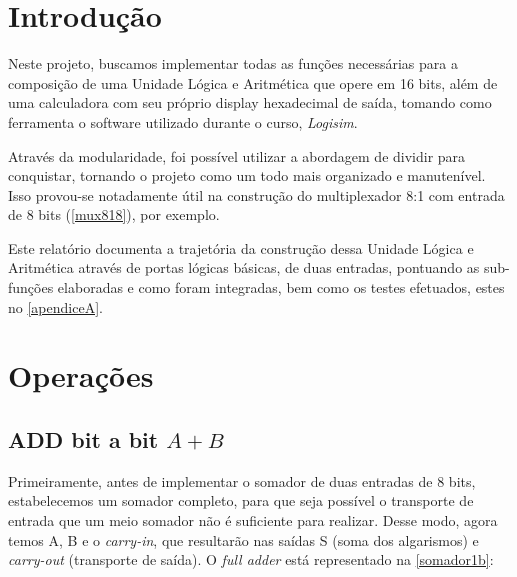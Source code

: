 \documentclass[
	12pt,				%
	openright,			%
	twoside,			%
	a4paper,			%
	english,			%
	french,				%
	spanish,			%
	brazil,				%
	]{abntex2}
\begin{document}

\frenchspacing 

\imprimircapa

\imprimirfolhaderosto

\tableofcontents*

\textual

\chapter*[Introdução]{Introdução}

Neste projeto, buscamos implementar todas as funções necessárias para a composição de uma Unidade Lógica e Aritmética que opere em 16 bits, além de uma calculadora com seu próprio display hexadecimal de saída, tomando como ferramenta o software utilizado durante o curso, \textit{Logisim}.

Através da modularidade, foi possível utilizar a abordagem de dividir para conquistar, tornando o projeto como um todo mais organizado e manutenível. Isso provou-se notadamente útil na construção do multiplexador 8:1 com entrada de 8 bits (\autoref{mux818}), por exemplo.

Este relatório documenta a trajetória da construção dessa Unidade Lógica e Aritmética através de portas lógicas básicas, de duas entradas, pontuando as sub-funções elaboradas e como foram integradas, bem como os testes efetuados, estes no \autoref{apendiceA}.


\chapter{Operações}\label{operacoes}

\section{ADD bit a bit \texorpdfstring{$A+B$}{Lg}}

Primeiramente, antes de implementar o somador de duas entradas de 8 bits, estabelecemos um somador completo, para que seja possível o transporte de entrada que um meio somador não é suficiente para realizar. Desse modo, agora temos A, B e o \textit{carry-in}, que resultarão nas saídas S (soma dos algarismos) e \textit{carry-out} (transporte de saída). O \textit{full adder} está representado na \autoref{somador1b}:
\end{document}
